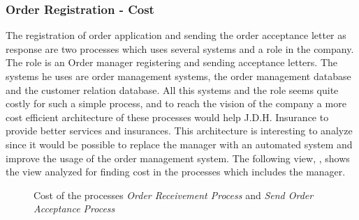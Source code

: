 \subsubsection{Order Registration - Cost}
\label{sec:order_analysis}
The registration of order application and sending the order acceptance letter as response are two processes which uses several systems and a role in the company. The role is an Order manager registering and sending acceptance letters. The systems he uses are order management systems, the order management database and the customer relation database. All this systems and the role seems quite costly for such a simple process, and to reach the vision of the company a more cost efficient architecture of these processes would help J.D.H. Insurance to provide better services and insurances. This architecture is interesting to analyze since it would be possible to replace the manager with an automated system and improve the usage of the order management system. The following view, , shows the view analyzed for finding cost in the processes which includes the manager. 
\begin{center}
	\begin{figure}[H]
		\centering
		\setlength\fboxsep{7pt}
		\setlength\fboxrule{0.5pt}
		\caption{Cost of the processes \textsl{Order Receivement Process} and \textsl{Send Order Acceptance Process}}
		\label{fig:map_order_cost}
	\end{figure}
\end{center}
